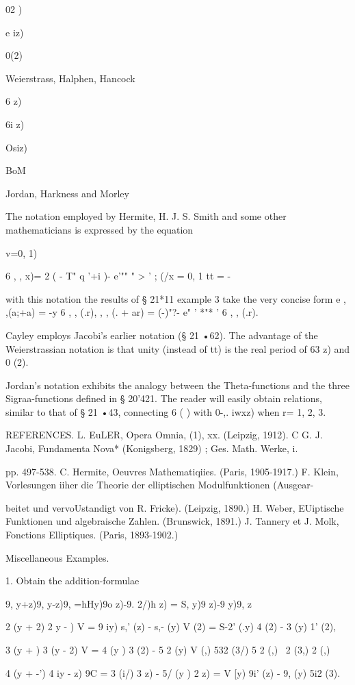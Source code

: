 02 )

e iz)

 0(2)

Weierstrass, Halphen, Hancock

6 z)

6i z)

Osiz)

BoM

Jordan, Harkness and Morley

The notation employed by Hermite, H. J. S. Smith and some other
mathematicians is expressed by the equation

v=0, 1)

6 , , x)= 2 ( - T" q '+i )- e'"" " > ' ; (/x = 0, 1 tt = -

with this notation the results of § 21*11 example 3 take the very
concise form e , ,(a;+a) = -y 6 , , (.r), , , (. + ar) = (-)"?- e" '
*"* ' 6 , , (.r).

Cayley employs Jacobi's earlier notation (§ 21 •62). The advantage of
the Weierstrassian notation is that unity (instead of tt) is the real
period of 63 z) and 0 (2).

Jordan's notation exhibits the analogy between the Theta-functions and
the three Sigraa-functions defined in § 20'421. The reader will easily
obtain relations, similar to that of § 21 •43, connecting 6 ( ) with
0-,. iwxz) when r= 1, 2, 3.

REFERENCES. L. EuLER, Opera Omnia, (1), xx. (Leipzig, 1912). C G. J.
Jacobi, Fundamenta Nova* (Konigsberg, 1829) ; Ges. Math. Werke, i.

pp. 497-538. C. Hermite, Oeuvres Mathematiqiies. (Paris, 1905-1917.)
F. Klein, Vorlesungen iiher die Theorie der elliptischen
Modulfunktionen (Ausgear-

beitet und vervoUstandigt von R. Fricke). (Leipzig, 1890.) H. Weber,
EUiptische Funktionen und algebraische Zahlen. (Brunswick, 1891.) J.
Tannery et J. Molk, Fonctions Elliptiques. (Paris, 1893-1902.)

Miscellaneous Examples.

1. Obtain the addition-formulae

9, y+z)9, y-z)9, =hHy)9o z)-9. 2/)h z) = S, y)9 z)-9 y)9, z\

 2 (y + 2) 2 y - ) V = 9 iy) s,' (z) - s,- (y) V (2) = S-2' (.y) 4 (2)
- 3 (y) 1' (2),

 3 (y + ) 3 (y - 2) V = 4 (y ) 3 (2) - 5 2 (y) V (,) 532 (3/) 5 2 (,)
\ 2 (3,) 2 (,)

 4 (y + -') 4 iy - z) 9C = 3 (i/) 3 z) - 5/ (y ) 2 z) = V [y) 9i' (z)
- 9, (y) 5i2 (3).

